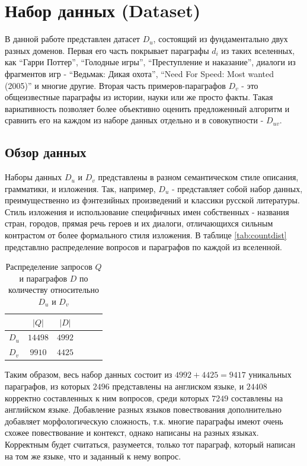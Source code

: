 \section{Набор данных (Dataset)}
\label{sec:dataset}

В данной работе представлен датасет $D_u$, состоящий из фундаментально двух разных доменов. Первая его часть 
покрывает параграфы $d_i$ из таких вселенных, как ``Гарри Поттер'', ``Голодные игры'', ``Преступление и наказание'', диалоги из фрагментов игр - ``Ведьмак: Дикая охота'', ``Need For Speed: Most wanted (2005)'' и многие другие.
Вторая часть примеров-параграфов $D_v$ - это общеизвестные параграфы из истории, науки или же просто факты.
Такая вариативность позволяет более объективно оценить предложенный алгоритм и сравнить его на каждом из наборе данных отдельно и в совокупности - $D_{uv}$. 


\subsection{Обзор данных}

Наборы данных $D_u$ и $D_v$ представлены в разном семантическом стиле описания, грамматики, и изложения. Так, например, $D_u$ - 
представляет собой набор данных, преимущественно из фэнтезийных произведений и классики русской литературы. Стиль изложения и использование 
специфичных имен собственных - названия стран, городов, прямая речь героев и их диалоги, отличающихся сильным контрастом от 
более формального стиля изложения.  В таблице \eqref{tab:countdist} представлно распределение вопросов и параграфов по каждой из вселенной.

\begin{table}[h]
    \centering
    \begin{tabular}{l|ccccc}
        \textbf{} & \textbf{$|Q|$} & \textbf{$|D|$}  \\
        \hline
        \textbf{$D_{u}$}  &$14498$ &$4992$  \\
        \textbf{$D_{v}$}  &$9910$  &$4425$ \\
    \end{tabular}
    \caption{Распределение запросов $Q$ и параграфов $D$ по количеству относительно $D_u$ и $D_v$}
    \label{tab:countdist}
\end{table}

Таким образом, весь набор данных состоит из \textbf{$4992 + 4425=9417$} уникальных параграфов, из  которых $2496$ представлены на англиском языке, и 
\textbf{$24408$} корректно составленных к ним вопросов, среди которых $7249$ составлены на английском языке. Добавление разных языков повествования дополнительно добавляет 
морфологическую сложность, т.к. многие параграфы имеют очень схожее повествование и контекст, однако написаны на разных языках. Корректным будет считаться, разумеется, только тот параграф, который написан на том же языке, что и заданный к нему вопрос.

